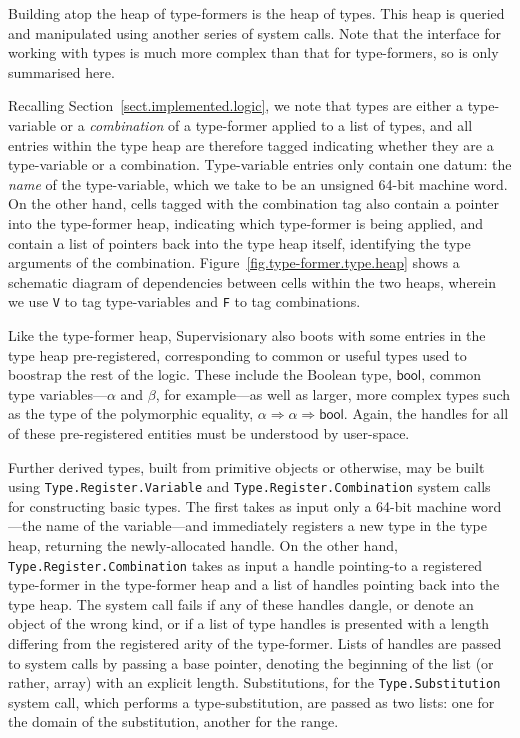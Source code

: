 \documentclass[a4paper, UKenglish, cleveref, autoref, thm-restate, colorlinks]{lipics-v2021}
\begin{document}
Building atop the heap of type-formers is the heap of types.
This heap is queried and manipulated using another series of system calls.
Note that the interface for working with types is much more complex than that for type-formers, so is only summarised here.

Recalling Section~\ref{sect.implemented.logic}, we note that types are either a type-variable or a \emph{combination} of a type-former applied to a list of types, and all entries within the type heap are therefore tagged indicating whether they are a type-variable or a combination.
Type-variable entries only contain one datum: the \emph{name} of the type-variable, which we take to be an unsigned 64-bit machine word.
On the other hand, cells tagged with the combination tag also contain a pointer into the type-former heap, indicating which type-former is being applied, and contain a list of pointers back into the type heap itself, identifying the type arguments of the combination.
Figure~\ref{fig.type-former.type.heap} shows a schematic diagram of dependencies between cells within the two heaps, wherein we use \texttt{V} to tag type-variables and \texttt{F} to tag combinations.

Like the type-former heap, Supervisionary also boots with some entries in the type heap pre-registered, corresponding to common or useful types used to boostrap the rest of the logic.
These include the Boolean type, $\mathsf{bool}$, common type variables---$\alpha$ and $\beta$, for example---as well as larger, more complex types such as the type of the polymorphic equality, $\alpha \Rightarrow \alpha \Rightarrow \mathsf{bool}$.
Again, the handles for all of these pre-registered entities must be understood by user-space.

Further derived types, built from primitive objects or otherwise, may be built using \texttt{Type.Register.Variable} and \texttt{Type.Register.Combination} system calls for constructing basic types.
The first takes as input only a 64-bit machine word---the name of the variable---and immediately registers a new type in the type heap, returning the newly-allocated handle.
On the other hand, \texttt{Type.Register.Combination} takes as input a handle pointing-to a registered type-former in the type-former heap and a list of handles pointing back into the type heap.
The system call fails if any of these handles dangle, or denote an object of the wrong kind, or if a list of type handles is presented with a length differing from the registered arity of the type-former.
Lists of handles are passed to system calls by passing a base pointer, denoting the beginning of the list (or rather, array) with an explicit length.
Substitutions, for the \texttt{Type.Substitution} system call, which performs a type-substitution, are passed as two lists: one for the domain of the substitution, another for the range.
\end{document}
